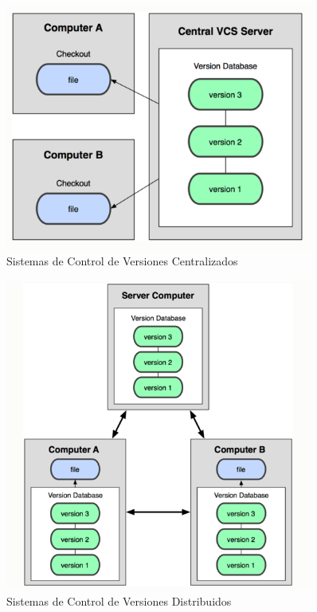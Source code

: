 \begin{enumerate}
\begin{figure}
\begin{center}
  \includegraphics[width=0.9\textwidth]{Imagenes/grafico2.png}
\caption{Sistemas de Control de Versiones Centralizados}
\end{center}
\end{figure}

\begin{figure}
\begin{center}
  \includegraphics[width=0.9\textwidth]{Imagenes/grafico3.png}
\caption{Sistemas de Control de Versiones Distribuidos}
\end{center}
\end{figure}


\end{enumerate}



